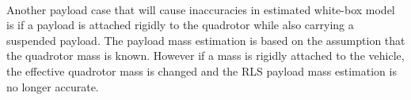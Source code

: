         \paragraph{}
        Another payload case that will cause inaccuracies in estimated white-box model 
        is if a payload is attached rigidly to the quadrotor while also carrying a suspended payload.
        The payload mass estimation is based on the assumption that the quadrotor mass is known.
        However if a mass is rigidly attached to the vehicle, the effective quadrotor mass is changed and the RLS payload mass estimation is no longer accurate.


